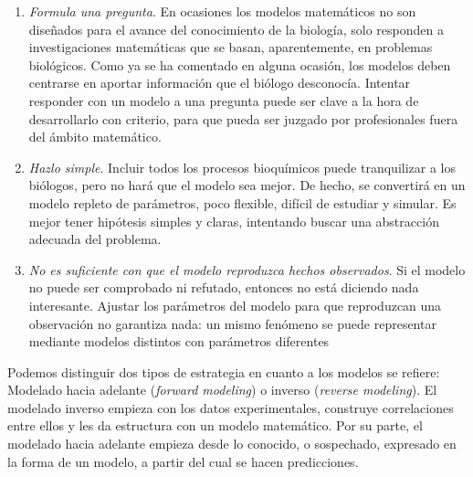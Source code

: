 \begin{enumerate}
	\item \textit{Formula una pregunta}. En ocasiones los modelos matemáticos no son diseñados para el avance del conocimiento de la biología, solo responden a investigaciones matemáticas que se basan, aparentemente, en problemas biológicos. Como ya se ha comentado en alguna ocasión, los modelos deben centrarse en aportar información que el biólogo desconocía. Intentar responder con un modelo a una pregunta puede ser clave a la hora de desarrollarlo con criterio, para que pueda ser juzgado por profesionales fuera del ámbito matemático. 
	
	\item \textit{Hazlo simple}. Incluir todos los procesos bioquímicos puede tranquilizar a los biólogos, pero no hará que el modelo sea mejor. De hecho, se convertirá en un modelo repleto de parámetros, poco flexible, difícil de estudiar y simular. Es mejor tener hipótesis simples y claras, intentando buscar una abstracción adecuada del problema.
	
	\item \textit{No es suficiente con que el modelo reproduzca hechos observados}. Si el modelo no puede ser comprobado ni refutado, entonces no está diciendo nada interesante. Ajustar los parámetros del modelo para que reproduzcan una observación no garantiza nada: un mismo fenómeno se puede representar mediante modelos distintos con parámetros diferentes

\end{enumerate}

Podemos distinguir dos tipos de estrategia en cuanto a los modelos se refiere: Modelado hacia adelante (\textit{forward modeling}) o inverso (\textit{reverse modeling}). El modelado inverso empieza con los datos experimentales, construye correlaciones entre ellos y les da estructura con un modelo matemático. Por su parte, el modelado hacia adelante empieza desde lo conocido, o sospechado, expresado en la forma de un modelo, a partir del cual se hacen predicciones. 

